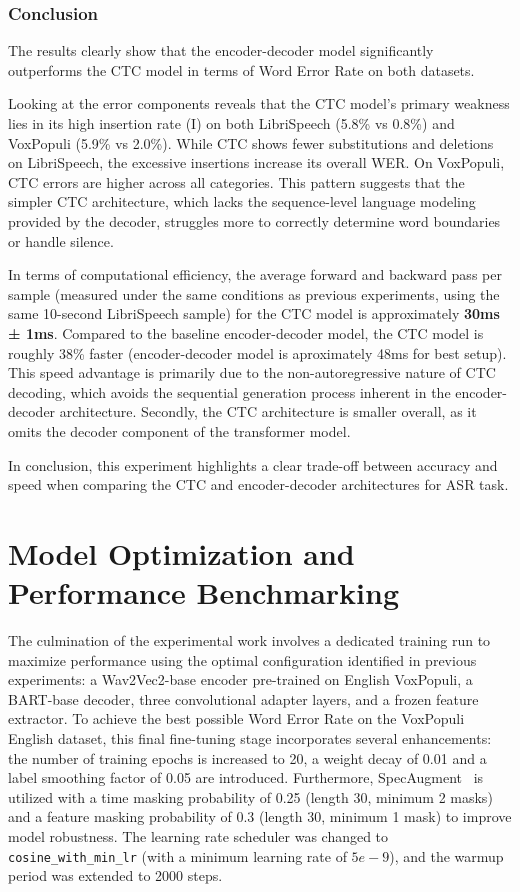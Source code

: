%
\subsubsection{Conclusion}

The results clearly show that the encoder-decoder model significantly outperforms the CTC model in terms of Word Error Rate on both datasets.

Looking at the error components reveals that the CTC model's primary weakness lies in its high insertion rate (I) on both LibriSpeech (5.8\% vs 0.8\%) and VoxPopuli (5.9\% vs 2.0\%). While CTC shows fewer substitutions and deletions on LibriSpeech, the excessive insertions increase its overall WER. On VoxPopuli, CTC errors are higher across all categories. This pattern suggests that the simpler CTC architecture, which lacks the sequence-level language modeling provided by the decoder, struggles more to correctly determine word boundaries or handle silence.

In terms of computational efficiency, the average forward and backward pass per sample (measured under the same conditions as previous experiments, using the same 10-second LibriSpeech sample) for the CTC model is approximately \textbf{30ms ± 1ms}. Compared to the baseline encoder-decoder model, the CTC model is roughly 38\% faster (encoder-decoder model is aproximately 48ms for best setup). This speed advantage is primarily due to the non-autoregressive nature of CTC decoding, which avoids the sequential generation process inherent in the encoder-decoder architecture. Secondly, the CTC architecture is smaller overall, as it omits the decoder component of the transformer model.

In conclusion, this experiment highlights a clear trade-off between accuracy and speed when comparing the CTC and encoder-decoder architectures for ASR task.


\section{Model Optimization and Performance Benchmarking}
\label{sec:final_performance_benchmarking}

The culmination of the experimental work involves a dedicated training run to maximize performance using the optimal configuration identified in previous experiments: a Wav2Vec2-base encoder pre-trained on English VoxPopuli, a BART-base decoder, three convolutional adapter layers, and a frozen feature extractor. To achieve the best possible Word Error Rate on the VoxPopuli English dataset, this final fine-tuning stage incorporates several enhancements: the number of training epochs is increased to 20, a weight decay of 0.01 and a label smoothing factor of 0.05 are introduced. Furthermore, SpecAugment~\cite{Park2019SpecAugment} is utilized with a time masking probability of 0.25 (length 30, minimum 2 masks) and a feature masking probability of 0.3 (length 30, minimum 1 mask) to improve model robustness. The learning rate scheduler was changed to \texttt{cosine\_with\_min\_lr} (with a minimum learning rate of $5e-9$), and the warmup period was extended to 2000 steps.

